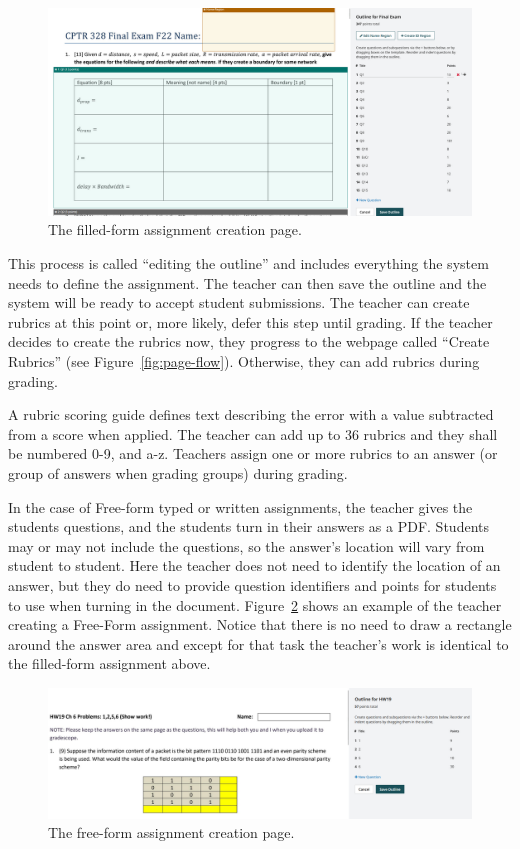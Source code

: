 \documentclass[ms,twoside,print]{nuthesis}
\begin{document}
\begin{figure}[htb]
    \centering
    \includegraphics[width=\textwidth]{images/filled-form-creation.png}
    \caption{The filled-form assignment creation page.}
    \label{fig:filled-form}
\end{figure}

This process is called ``editing the outline'' and includes everything the system needs to define the assignment. The teacher can then save the outline and the system will be ready to accept student submissions. The teacher can create rubrics at this point or, more likely, defer this step until grading. If the teacher decides to create the rubrics now, they progress to the webpage called ``Create Rubrics'' (see Figure~\ref{fig:page-flow}). Otherwise, they can add rubrics during grading.

A rubric scoring guide defines text describing the error with a value subtracted from a score when applied. The teacher can add up to 36 rubrics and they shall be numbered 0-9, and a-z. Teachers assign one or more rubrics to an answer (or group of answers when grading groups) during grading.  

In the case of Free-form typed or written assignments, the teacher gives the students questions, and the students turn in their answers as a PDF. Students may or may not include the questions, so the answer's location will vary from student to student. Here the teacher does not need to identify the location of an answer, but they do need to provide question identifiers and points for students to use when turning in the document. Figure~\ref{fig:free-form} shows an example of the teacher creating a Free-Form assignment. Notice that there is no need to draw a rectangle around the answer area and except for that task the teacher's work is identical to the filled-form assignment above.

\begin{figure}[htb]
    \centering
    \includegraphics[width=\textwidth]{images/free-form-creation.png}
    \caption{The free-form assignment creation page.}
    \label{fig:free-form}
\end{figure}
\end{document}
